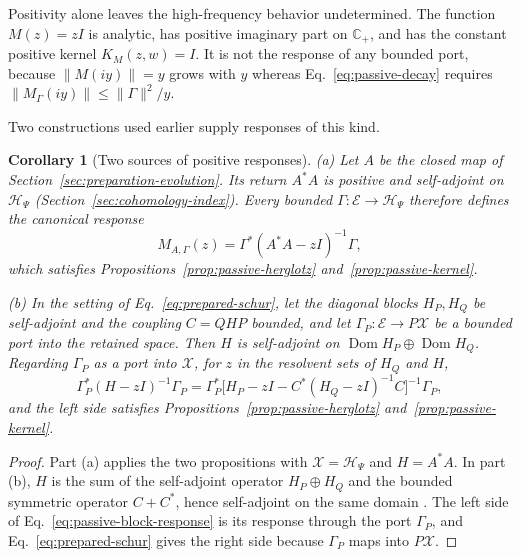 \documentclass[11pt]{article}
\newtheorem{corollary}[proposition]{Corollary}
\theoremstyle{definition}
\newcommand{\C}{\mathbb C}
\begin{document}
Positivity alone leaves the high-frequency behavior undetermined. The function $M(z)=zI$ is analytic, has positive imaginary part on $\C_+$, and has the constant positive kernel $K_M(z,w)=I$. It is not the response of any bounded port, because $\|M(iy)\|=y$ grows with $y$ whereas Eq.~\eqref{eq:passive-decay} requires $\|M_\Gamma(iy)\|\le\|\Gamma\|^2/y$.

Two constructions used earlier supply responses of this kind.

\begin{corollary}[Two sources of positive responses]
\label{cor:passive-sources}
\textup{(a)} Let $A$ be the closed map of Section~\ref{sec:preparation-evolution}. Its return $A^*A$ is positive and self-adjoint on $\mathcal H_\Psi$ (Section~\ref{sec:cohomology-index}). Every bounded $\Gamma:\mathcal E\to\mathcal H_\Psi$ therefore defines the canonical response
\begin{equation}
 M_{A,\Gamma}(z)=\Gamma^*(A^*A-zI)^{-1}\Gamma ,
 \label{eq:passive-canonical-response}
\end{equation}
which satisfies Propositions~\ref{prop:passive-herglotz} and~\ref{prop:passive-kernel}.

\textup{(b)} In the setting of Eq.~\eqref{eq:prepared-schur}, let the diagonal blocks $H_P,H_Q$ be self-adjoint and the coupling $C=QHP$ bounded, and let $\Gamma_P:\mathcal E\to P\mathcal X$ be a bounded port into the retained space. Then $H$ is self-adjoint on $\operatorname{Dom}H_P\oplus\operatorname{Dom}H_Q$. Regarding $\Gamma_P$ as a port into $\mathcal X$, for $z$ in the resolvent sets of $H_Q$ and $H$,
\begin{equation}
 \Gamma_P^*(H-zI)^{-1}\Gamma_P
   =\Gamma_P^*\bigl[H_P-zI-C^*(H_Q-zI)^{-1}C\bigr]^{-1}\Gamma_P ,
 \label{eq:passive-block-response}
\end{equation}
and the left side satisfies Propositions~\ref{prop:passive-herglotz} and~\ref{prop:passive-kernel}.
\end{corollary}
\begin{proof}
Part (a) applies the two propositions with $\mathcal X=\mathcal H_\Psi$ and $H=A^*A$. In part (b), $H$ is the sum of the self-adjoint operator $H_P\oplus H_Q$ and the bounded symmetric operator $C+C^*$, hence self-adjoint on the same domain \cite{Kato}. The left side of Eq.~\eqref{eq:passive-block-response} is its response through the port $\Gamma_P$, and Eq.~\eqref{eq:prepared-schur} gives the right side because $\Gamma_P$ maps into $P\mathcal X$.
\end{proof}
\end{document}
